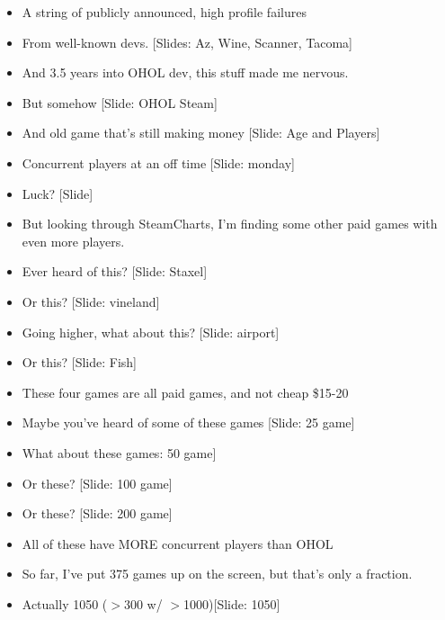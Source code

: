\documentclass[12pt]{article}
\begin{document}
{\begin{itemize}
\item A string of publicly announced, high profile failures

\item From well-known devs.  [Slides:  Az, Wine, Scanner, Tacoma]

\item And 3.5 years into OHOL dev, this stuff made me nervous.

\item But somehow [Slide:  OHOL Steam]

\item And old game that's still making money [Slide:  Age and Players]

\item Concurrent players at an off time [Slide: monday]

\item Luck?  [Slide]

\item But looking through SteamCharts, I'm finding some other paid games with even more players.

\item Ever heard of this?  [Slide:  Staxel]

\item Or this?  [Slide: vineland]

\item Going higher, what about this? [Slide: airport]

\item Or this? [Slide: Fish]

\item These four games are all paid games, and not cheap \$15-20

\item Maybe you've heard of some of these games [Slide: 25 game]

\item What about these games: 50 game]

\item Or these? [Slide: 100 game]

\item Or these? [Slide: 200 game]

\item All of these have MORE concurrent players than OHOL

\item So far, I've put 375 games up on the screen, but that's only a fraction.

\item Actually 1050 ($>$300 w/ $>$1000)[Slide:  1050]


\end{itemize}}
\end{document}
